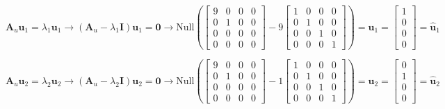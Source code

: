 \documentclass[a4paper, 11pt]{scrartcl}
\begin{document}
$$
\bm{A}_u \bm{u}_1 = \lambda_1 \bm{u}_1
\rightarrow
(\bm{A}_u - \lambda_1 \bm{I}) \bm{u}_1 = \bm{0}
\rightarrow
\text{Null}\left(
\begin{bmatrix}
9 & 0 & 0 & 0\\
0 & 1 & 0 & 0\\
0 & 0 & 0 & 0\\
0 & 0 & 0 & 0
\end{bmatrix}
-
9
\begin{bmatrix}
1 & 0 & 0 & 0\\
0 & 1 & 0 & 0\\
0 & 0 & 1 & 0\\
0 & 0 & 0 & 1
\end{bmatrix}
\right)
= \bm{u}_1 =
\begin{bmatrix}
1\\0\\0\\0
\end{bmatrix}
=\hat{\bm{u}}_1
$$




$$
\bm{A}_u \bm{u}_2 = \lambda_2 \bm{u}_2
\rightarrow
(\bm{A}_u - \lambda_2 \bm{I}) \bm{u}_2 = \bm{0}
\rightarrow
\text{Null}\left(
\begin{bmatrix}
9 & 0 & 0 & 0\\
0 & 1 & 0 & 0\\
0 & 0 & 0 & 0\\
0 & 0 & 0 & 0
\end{bmatrix}
-
1
\begin{bmatrix}
1 & 0 & 0 & 0\\
0 & 1 & 0 & 0\\
0 & 0 & 1 & 0\\
0 & 0 & 0 & 1
\end{bmatrix}
\right)
= \bm{u}_2 =
\begin{bmatrix}
0\\1\\0\\0
\end{bmatrix}
= \hat{\bm{u}}_2
$$
\end{document}
